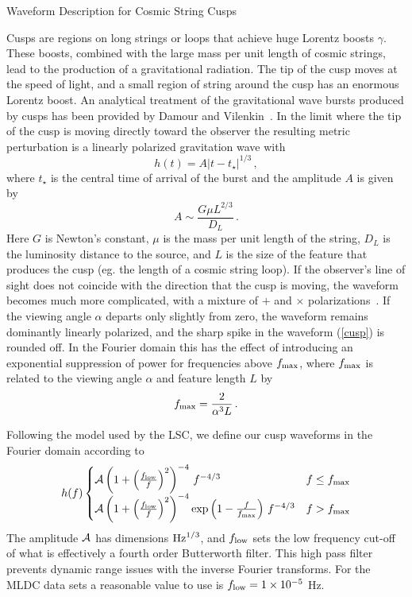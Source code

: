 \documentclass[12pt]{article}
\begin{document}
 

\centerline{\Large{Waveform Description for Cosmic String Cusps}}

\bigskip

Cusps are regions on long strings or loops that achieve huge Lorentz
boosts $\gamma$.
These boosts, combined with the large mass per unit length of cosmic
strings, lead to the production of a gravitational radiation. The tip of
the cusp moves at the speed of light, and a small region of string
around the cusp has an enormous Lorentz boost. An analytical treatment
of the gravitational wave bursts produced by cusps has been provided
by Damour and Vilenkin~\cite{cusp1}. In the limit where the tip of the
cusp is moving directly toward the observer the resulting
metric perturbation is a linearly polarized gravitation wave with
\begin{equation}\label{cusp}
h(t) = A \vert t - t_\star \vert^{1/3} \, ,
\end{equation}
where $t_\star$ is the central time of arrival of the burst and the
amplitude $A$ is given by~\cite{cusp2}
\begin{equation}
A \sim \frac{G \mu L^{2/3}}{D_L} \, .
\end{equation}
Here $G$ is Newton's constant, $\mu$ is the mass per unit length of the
string, $D_L$ is the luminosity distance to the source, and $L$
is the size of the feature that produces the cusp (eg. the length of
a cosmic string loop). If the observer's line of sight does not coincide
with the direction that the cusp is moving, the waveform becomes much more
complicated, with a mixture of $+$ and $\times$
polarizations~\cite{cusp3}. If the viewing angle $\alpha$ departs
only slightly from zero, the waveform remains dominantly linearly
polarized, and the sharp spike in the waveform (\ref{cusp}) is rounded
off. In the Fourier domain this has the effect of introducing an
exponential suppression of power for frequencies above $f_{\rm max}$,
where $f_{\rm max}$ is related to the viewing angle $\alpha$ and
feature length $L$ by
\begin{equation}
f_{\rm max} = \frac{2}{\alpha^3 L} \, .
\end{equation}

Following the model used by the LSC, we define our cusp waveforms
in the Fourier domain according to
\begin{equation}
h(f)
\begin{cases} 
{\cal A} \left(1 + \left(\frac{f_{\rm low}}{f}\right)^2\right)^{-4}
\, f^{-4/3}  & f \leq f_{\rm max} \\
{\cal A} \left(1 + \left(\frac{f_{\rm low}}{f}\right)^2\right)^{-4}
\exp\left( 1 - \frac{f}{f_{\rm max}}\right) \, f^{-4/3}& f > f_{\rm max}
\end{cases}
\end{equation}
The amplitude ${\cal A}$ has dimensions ${\rm Hz}^{1/3}$, and $f_{\rm low}$
sets the low frequency cut-off of what is effectively a fourth order
Butterworth filter. This high pass filter prevents dynamic range issues
with the inverse Fourier transforms. For the MLDC data sets a reasonable
value to use is $f_{\rm low} = 1 \times 10^{-5}$ Hz.
\end{document}
